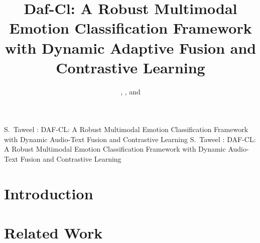 \documentclass{ieeeaccess}
\def\textsc#1{\textnormal{{\sc #1}}}%
\begin{document}
\title{\textsc{Daf-Cl}: A Robust Multimodal Emotion Classification Framework with Dynamic Adaptive Fusion and Contrastive Learning}


\author{\uppercase{},  \uppercase{}, and \uppercase{}
}



\markboth
{S.~Taweel \headeretal: \textsc{DAF-CL}: A Robust Multimodal Emotion Classification Framework with Dynamic Audio-Text Fusion and Contrastive Learning}
{S.~Taweel \headeretal: \textsc{DAF-CL}: A Robust Multimodal Emotion Classification Framework with Dynamic Audio-Text Fusion and Contrastive Learning}



\begin{abstract}

\end{abstract}


\begin{keywords}

\end{keywords}

\titlepgskip=-15pt

\maketitle
\def\textsc#1{\textnormal{{\sc #1}}}%

\section{Introduction}\label{sec:introduction}



\section{Related Work}\label{sec:related work}


\end{document}
